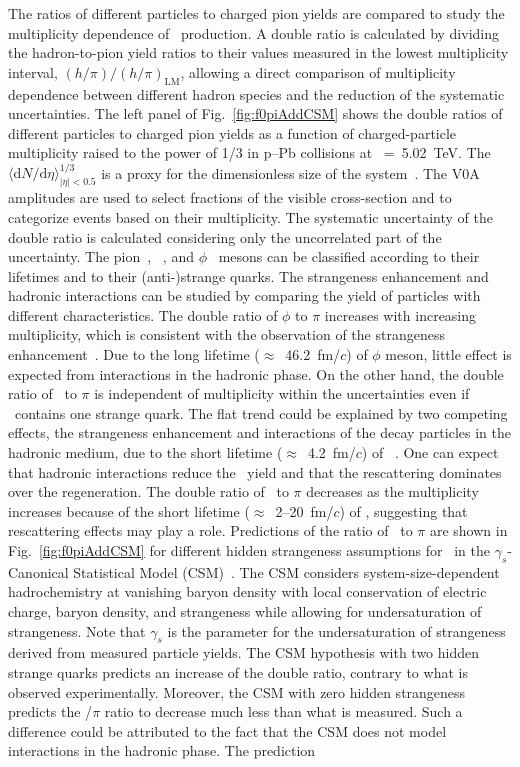 The ratios of different particles to charged pion yields are compared to study the multiplicity dependence of \fzero~production. A double ratio is calculated by dividing the hadron-to-pion yield ratios to their values measured in the lowest multiplicity interval, $(h/\pi)/(h/\pi)_{\mathrm{LM}}$, allowing a direct comparison of multiplicity dependence between different hadron species and the reduction of the systematic uncertainties. The left panel of Fig.~\ref{fig:f0piAddCSM} shows the double ratios of different particles to charged pion yields as a function of charged-particle multiplicity raised to the power of 1/3 in p--Pb collisions at \snn~=~5.02~TeV. The $\langle \mathrm{d}N/\mathrm{d}\eta \rangle_{|\eta|<0.5}^{1/3}$ is a proxy for the dimensionless size of the system~\cite{Liu:2018xae}. The V0A amplitudes are used to select fractions of the visible cross-section and to categorize events based on their multiplicity. The systematic uncertainty of the double ratio is calculated considering only the uncorrelated part of the uncertainty. The pion~\cite{ALICE:2016dei}, \kstar~\cite{ALICE:2016sak}, and $\phi$~\cite{ALICE:2016sak} mesons can be classified according to their lifetimes and to their (anti-)strange quarks. The strangeness enhancement and hadronic interactions can be studied by comparing the yield of particles with different characteristics. The double ratio of $\phi$ to $\pi$ increases with increasing multiplicity, which is consistent with the observation of the strangeness enhancement~\cite{ALICE:2016fzo}. Due to the long lifetime ($\approx$~46.2~fm/$c$) of $\phi$ meson, little effect is expected from interactions in the hadronic phase. On the other hand, the double ratio of \kstar~to $\pi$ is independent of multiplicity within the uncertainties even if \kstar~contains one strange quark. The flat trend could be explained by two competing effects, the strangeness enhancement and interactions of the decay particles in the hadronic medium, due to the short lifetime ($\approx$~4.2~fm/$c$) of \kstar~\cite{ParticleDataGroup:2022pth}. One can expect that hadronic interactions reduce the \kstar~yield and that the rescattering dominates over the regeneration. The double ratio of \fzero~to $\pi$ decreases as the multiplicity increases because of the short lifetime ($\approx$~2--20~fm/$c$) of \fzero, suggesting that rescattering effects may play a role. Predictions of the ratio of \fzero~to $\pi$ are shown in Fig.~\ref{fig:f0piAddCSM} for different hidden strangeness assumptions for \fzero~in the $\gamma_{s}$-Canonical Statistical Model (CSM)~\cite{Vovchenko:2019kes}. The CSM considers system-size-dependent hadrochemistry at vanishing baryon density with local conservation of electric charge, baryon density, and strangeness while allowing for undersaturation of strangeness. Note that $\gamma_{s}$ is the parameter for the undersaturation of strangeness derived from measured particle yields. The CSM hypothesis with two hidden strange quarks predicts an increase of the double ratio, contrary to what is observed experimentally. Moreover, the CSM with zero hidden strangeness predicts the \fzero/$\pi$ ratio to decrease much less than what is measured. Such a difference could be attributed to the fact that the CSM does not model interactions in the hadronic phase. The prediction 